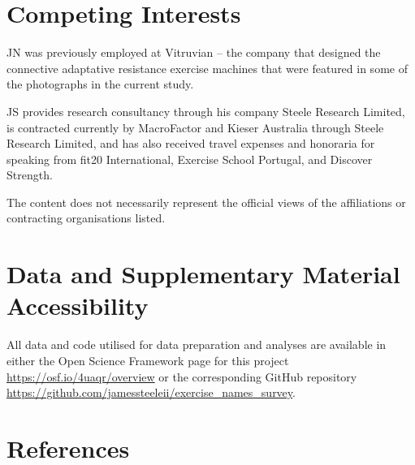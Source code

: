 \documentclass[
]{article}
\begin{document}
\section{Competing Interests}\label{competing-interests}

JN was previously employed at Vitruvian -- the company that designed the
connective adaptative resistance exercise machines that were featured in
some of the photographs in the current study.

JS provides research consultancy through his company Steele Research
Limited, is contracted currently by MacroFactor and Kieser Australia
through Steele Research Limited, and has also received travel expenses
and honoraria for speaking from fit20 International, Exercise School
Portugal, and Discover Strength.

The content does not necessarily represent the official views of the
affiliations or contracting organisations listed.

\section{Data and Supplementary Material
Accessibility}\label{data-and-supplementary-material-accessibility}

All data and code utilised for data preparation and analyses are
available in either the Open Science Framework page for this project
\url{https://osf.io/4uaqr/overview} or the corresponding GitHub
repository \url{https://github.com/jamessteeleii/exercise_names_survey}.

\section{References}\label{references}
\end{document}
